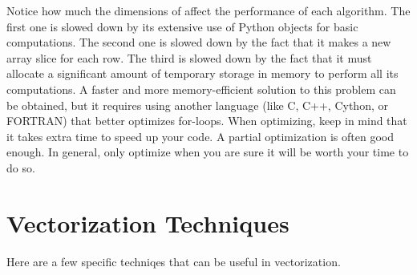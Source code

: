 Notice how much the dimensions of  affect the performance of each algorithm.
The first one is slowed down by its extensive use of Python objects for basic computations.
The second one is slowed down by the fact that it makes a new array slice for each row.
The third is slowed down by the fact that it must allocate a significant amount of temporary storage in memory to perform all its computations.
A faster and more memory-efficient solution to this problem can be obtained, but it requires using another language (like C, C++, Cython, or FORTRAN) that better optimizes for-loops.
When optimizing, keep in mind that it takes extra time to speed up your code.
A partial optimization is often good enough.
In general, only optimize when you are sure it will be worth your time to do so.

\section*{Vectorization Techniques}

Here are a few specific techniqes that can be useful in vectorization.

